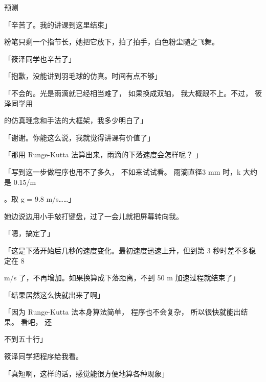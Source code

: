 预测\par
「辛苦了。我的讲课到这里结束」\par
粉笔只剩一个指节长，她把它放下，拍了拍手，白色粉尘随之飞舞。\par
「筱泽同学也辛苦了」\par
「抱歉，没能讲到羽毛球的仿真。时间有点不够」\par
「不会的。光是雨滴就已经相当难了， 如果换成双轴， 我大概跟不上。不过， 筱泽同学用\par
的仿真理念和手法的大框架，我多少明白了」\par
「谢谢。你能这么说，我就觉得讲课有价值了」\par
「那用 Runge-Kutta 法算出来，雨滴的下落速度会怎样呢？ 」\par
「写到这一步做程序也用不了多久， 不如来试试看。 雨滴直径3 mm 时，k 大约是 0.15/m\par
[5] 。取 g = 9.8 m/s……」\par
她边说边用小手敲打键盘，过了一会儿就把屏幕转向我。\par
「嗯，搞定了」\par
「这是下落开始后几秒的速度变化。最初速度迅速上升，但到第 3 秒时差不多稳定在 8\par
m/s 了，不再增加。如果换算成下落距离，不到 50 m 加速过程就结束了」\par
「结果居然这么快就出来了啊」\par
「因为 Runge-Kutta 法本身算法简单， 程序也不会复杂， 所以很快就能出结果。 看吧， 还\par
不到五十行」\par
筱泽同学把程序给我看。\par
「真短啊，这样的话，感觉能很方便地算各种现象」\par

